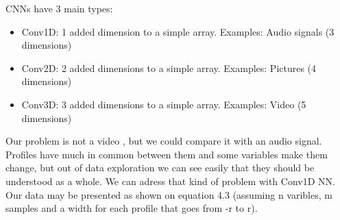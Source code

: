 \documentclass[openany]{article}
\begin{document}
CNNs have 3 main types:

\begin{itemize}
	\item Conv1D: 1 added dimension to a simple array. Examples: Audio signals (3 dimensions)
	\item Conv2D: 2 added dimensions to a simple array. Examples: Pictures (4 dimensions) 
	\item Conv3D: 3 added dimensions to a simple array. Examples: Video (5 dimensions)
\end{itemize}

Our problem is not a video , but we could compare it with an audio signal. Profiles have much in common between them and some variables make them change, but out of data exploration we can see easily that they should be understood as a whole. We can adress that kind of problem with Conv1D NN. Our data may be presented as shown on equation 4.3 (assuming n varibles, m samples and a width for each profile that goes from -r to r). \\
\end{document}
